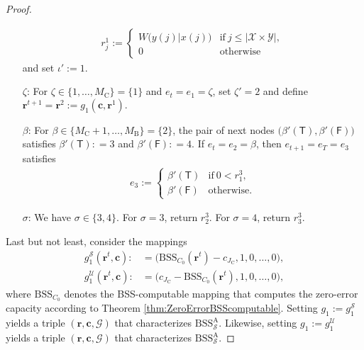\documentclass[conference]{IEEEtran}
\def\X{{\mathcal X}}
\def\Y{{\mathcal Y}}
\def\G{{\mathcal G}}
\def\S{{\mathcal S}}
\def\U{{\mathcal U}}
\def\mA{\bm{\mathrm{A}}}
\newcommand{\BSS}{\mathrm{BSS}}
\begin{document}
\begin{proof}
\begin{enumerate}
											\begin{align}	r^1_j :=	\begin{cases}	W\big(y(j)|x(j)\big)	&\text{if}~ j\leq |\X\times\Y|,\\
																						0						&\text{otherwise}
																		\end{cases}
											\end{align}
											and set \(\iota' := 1\).
										\item[\(\zeta\)\hspace{1pt}:] For \(\zeta \in \{1,\ldots, M_\mathrm{C}\} = \{1\}\) and \(e_t = e_1 = \zeta\), set \(\zeta' = 2\) and define 
											\(\bm{r}^{t+1} = \bm{r}^{2} := g_1(\bm{c},\bm{r}^1).
											\)
										\item[\(\beta\)\hspace{1pt}:] 
											For \(\beta \in \{M_\mathrm{C} + 1,\ldots, M_\mathrm{B}\} = \{2\}\), the pair of next nodes \(\big(\beta'(\mathsf{T}),
											\beta'(\mathsf{F})\big)\) satisfies
											\(\beta'(\mathsf{T}) :    =  3\) and \(\beta'(\mathsf{F}) :    =  4\).
											If \(e_t = e_2 = \beta\), then \(e_{t+1} = e_T = e_3\) satisfies
											\begin{align*}   e_{3} := 	\begin{cases}   \beta'(\mathsf{T}) &\text{if}~ 0 < r_1^3,\\
																						\beta'(\mathsf{F}) &\text{otherwise}.
																		\end{cases}
											\end{align*}
										\item[\(\sigma\)\hspace{1pt}:] We have \(\sigma \in \{3,4\}\). For \(\sigma = 3\), return \(r_2^3\). For \(\sigma = 4\), return \(r_3^3\).
					\end{enumerate}
					Last but not least, consider the mappings
					\begin{align*}	g_1^\S(\bm{r}^t,\bm{c}) :&= \big(\BSS_{C_0}(\bm{r}^t) - c_{J_\mathrm{C}}, 1, 0, \ldots, 0\big), \\
									g_1^\U(\bm{r}^t,\bm{c}) :&= \big(c_{J_\mathrm{C}} - \BSS_{C_0}(\bm{r}^t), 1, 0, \ldots, 0\big), 
					\end{align*}
					where \(\BSS_{C_0}\) denotes the BSS-computable mapping that computes the zero-error capacity according to Theorem \ref{thm:ZeroErrorBSScomputable}. 
					Setting \(g_1 := g_1^\S\) yields a triple \((\bm{r}, \bm{c}, \G)\)
					that characterizes \(\BSS_{\S}^{\mA}\). Likewise, setting \(g_1 := g_1^\U\) yields a triple \((\bm{r}, \bm{c}, \G)\)
					that characterizes \(\BSS_{\S}^{\mA}\).
	\end{proof}
	
\end{document}
